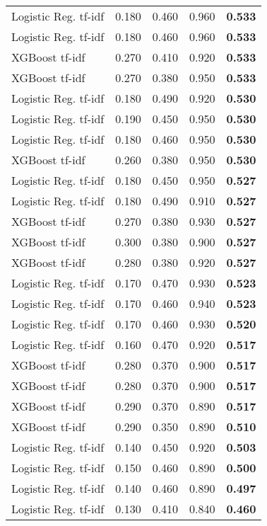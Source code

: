 \begin{table*}[ht]
\begin{tabular}{l r r r r }
Logistic Reg. tf-idf & 0.180 & 0.460 & 0.960 & \textbf{0.533} \\
Logistic Reg. tf-idf & 0.180 & 0.460 & 0.960 & \textbf{0.533} \\
XGBoost tf-idf & 0.270 & 0.410 & 0.920 & \textbf{0.533} \\
XGBoost tf-idf & 0.270 & 0.380 & 0.950 & \textbf{0.533} \\
Logistic Reg. tf-idf & 0.180 & 0.490 & 0.920 & \textbf{0.530} \\
Logistic Reg. tf-idf & 0.190 & 0.450 & 0.950 & \textbf{0.530} \\
Logistic Reg. tf-idf & 0.180 & 0.460 & 0.950 & \textbf{0.530} \\
XGBoost tf-idf & 0.260 & 0.380 & 0.950 & \textbf{0.530} \\
Logistic Reg. tf-idf & 0.180 & 0.450 & 0.950 & \textbf{0.527} \\
Logistic Reg. tf-idf & 0.180 & 0.490 & 0.910 & \textbf{0.527} \\
XGBoost tf-idf & 0.270 & 0.380 & 0.930 & \textbf{0.527} \\
XGBoost tf-idf & 0.300 & 0.380 & 0.900 & \textbf{0.527} \\
XGBoost tf-idf & 0.280 & 0.380 & 0.920 & \textbf{0.527} \\
Logistic Reg. tf-idf & 0.170 & 0.470 & 0.930 & \textbf{0.523} \\
Logistic Reg. tf-idf & 0.170 & 0.460 & 0.940 & \textbf{0.523} \\
Logistic Reg. tf-idf & 0.170 & 0.460 & 0.930 & \textbf{0.520} \\
Logistic Reg. tf-idf & 0.160 & 0.470 & 0.920 & \textbf{0.517} \\
XGBoost tf-idf & 0.280 & 0.370 & 0.900 & \textbf{0.517} \\
XGBoost tf-idf & 0.280 & 0.370 & 0.900 & \textbf{0.517} \\
XGBoost tf-idf & 0.290 & 0.370 & 0.890 & \textbf{0.517} \\
XGBoost tf-idf & 0.290 & 0.350 & 0.890 & \textbf{0.510} \\
Logistic Reg. tf-idf & 0.140 & 0.450 & 0.920 & \textbf{0.503} \\
Logistic Reg. tf-idf & 0.150 & 0.460 & 0.890 & \textbf{0.500} \\
Logistic Reg. tf-idf & 0.140 & 0.460 & 0.890 & \textbf{0.497} \\
Logistic Reg. tf-idf & 0.130 & 0.410 & 0.840 & \textbf{0.460} \\
\hline
\end{tabular}
\label{tab:f1_summary}
\end{table*}
